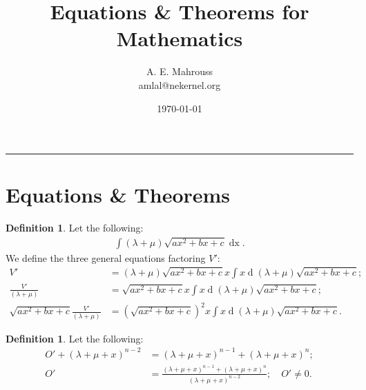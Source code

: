\documentclass[10pt]{article}
\title{Equations \& Theorems for Mathematics}
\author{A. E. Mahrouss\\amlal@nekernel.org}
\date{\today}
\theoremstyle{plain}
\theoremstyle{definition}
\newtheorem{definition}[theorem]{Definition}
\theoremstyle{remark}
\begin{document}
\maketitle
\vspace{-0.5em}
\vspace{0.8em}
\rule{\linewidth}{0.4pt}
\vspace{1em}

\section{Equations \& Theorems}

\begin{definition}
	Let the following:
	\begin{align*}
		\int (\lambda + \mu)\sqrt{ax^2 + bx  +c} \operatorname{dx}.
	\end{align*}
	We define the three general equations factoring $V'$:
	\begin{align*}
		V' &= (\lambda + \mu)\sqrt{ax^2 + bx  +c}x \int x \operatorname{d}(\lambda + \mu)\sqrt{ax^2 + bx  +c};\\
		\frac{V'}{(\lambda + \mu)} &= \sqrt{ax^2 + bx  +c}x \int x \operatorname{d}(\lambda + \mu)\sqrt{ax^2 + bx  +c};\\
		\sqrt{ax^2 + bx  +c}\frac{V'}{(\lambda + \mu)} &= (\sqrt{ax^2 + bx  +c})^{2}x \int x \operatorname{d}(\lambda + \mu)\sqrt{ax^2 + bx  +c}.
	\end{align*}
\end{definition}
\begin{definition}
	Let the following:
	\begin{align*}
		O' + (\lambda + \mu + x)^{n-2} &= (\lambda + \mu + x)^{n-1} + (\lambda + \mu + x)^{n};\\
		O' &= \frac{(\lambda + \mu + x)^{n-1} + (\lambda + \mu + x)^{n}}{(\lambda + \mu + x)^{n-2}}; \quad O' \neq 0.
	\end{align*}
\end{definition}

\nocite{*}



\end{document}
